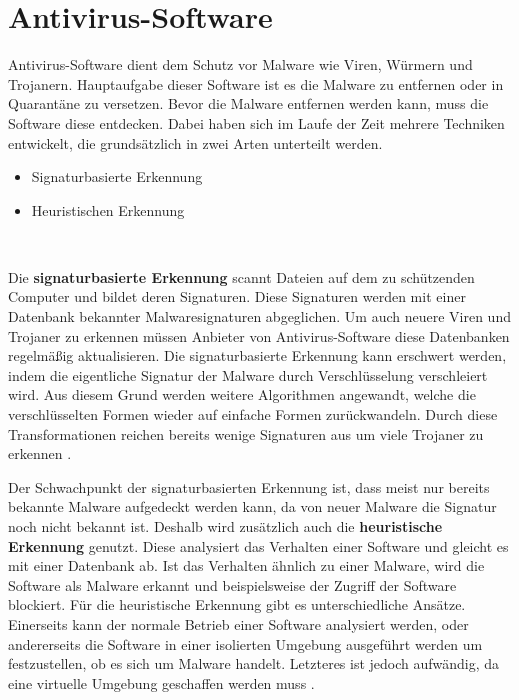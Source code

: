 \section{Antivirus-Software}\label{sec:antivirus}
Antivirus-Software dient dem Schutz vor Malware wie Viren, Würmern und Trojanern.
Hauptaufgabe dieser Software ist es die Malware zu entfernen oder in Quarantäne zu versetzen.
Bevor die Malware entfernen werden kann, muss die Software diese entdecken.
Dabei haben sich im Laufe der Zeit mehrere Techniken entwickelt, die grundsätzlich 
in zwei Arten unterteilt werden.\cite{ANTNE1}
\begin{itemize}
    \item Signaturbasierte Erkennung
    \item Heuristischen Erkennung
\end{itemize}
\ 

Die \textbf{signaturbasierte Erkennung} scannt Dateien auf dem zu schützenden Computer 
und bildet deren Signaturen. 
Diese Signaturen werden mit einer Datenbank bekannter Malwaresignaturen abgeglichen.
Um auch neuere Viren und Trojaner zu erkennen müssen Anbieter von Antivirus-Software diese Datenbanken regelmäßig aktualisieren.
Die signaturbasierte Erkennung kann erschwert werden, indem die eigentliche Signatur der Malware durch Verschlüsselung verschleiert wird.
Aus diesem Grund werden weitere Algorithmen angewandt, welche die verschlüsselten Formen wieder auf einfache Formen zurückwandeln.
Durch diese Transformationen reichen bereits wenige Signaturen aus um
viele Trojaner zu erkennen \cite{ANTNE2}.

Der Schwachpunkt der signaturbasierten Erkennung ist, dass meist nur bereits bekannte Malware aufgedeckt werden kann,
da von neuer Malware die Signatur noch nicht bekannt ist.
Deshalb wird zusätzlich auch die \textbf{heuristische Erkennung} genutzt. 
Diese analysiert das Verhalten einer Software und gleicht es mit einer Datenbank ab.
Ist das Verhalten ähnlich zu einer Malware, wird die Software als Malware erkannt und beispielsweise der Zugriff der Software blockiert.
Für die heuristische Erkennung gibt es unterschiedliche Ansätze.
Einerseits kann der normale Betrieb einer Software analysiert werden,
oder andererseits die Software in einer isolierten Umgebung ausgeführt werden um festzustellen,
ob es sich um Malware handelt. 
Letzteres ist jedoch aufwändig, da eine virtuelle Umgebung geschaffen werden muss \cite{ANTNE3}.

